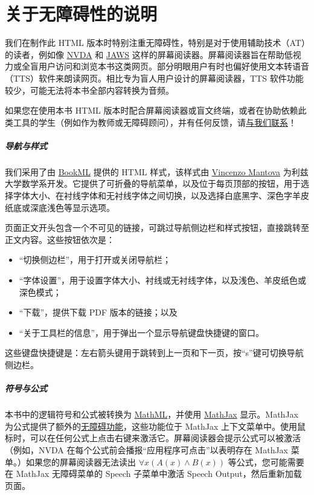 
\chapter{关于无障碍性的说明}

我们在制作此 HTML 版本时特别注重无障碍性，特别是对于使用辅助技术（AT）的读者，例如像 \href{https://www.nvaccess.org/download/}{NVDA} 和 \href{https://www.freedomscientific.com/products/software/jaws/}{JAWS} 这样的屏幕阅读器。屏幕阅读器旨在帮助低视力或全盲用户访问和浏览本书这类网页。部分明眼用户有时也偏好使用文本转语音（TTS）软件来朗读网页。相比专为盲人用户设计的屏幕阅读器，TTS 软件功能较少，可能无法将本书全部内容转换为音频。

如果您在使用本书 HTML 版本时配合屏幕阅读器或盲文终端，或者在协助依赖此类工具的学生（例如作为教师或无障碍顾问），并有任何反馈，请\href{mailto:rzach@ucalgary.ca}{与我们联系}！

\paragraph{导航与样式} 我们采用了由 \href{https://vlmantova.github.io/bookml/}{BookML} 提供的 HTML 样式，该样式由 \href{https://eps.leeds.ac.uk/maths/staff/4058/dr-vincenzo-l-mantova}{Vincenzo Mantova} 为利兹大学数学系开发。它提供了可折叠的导航菜单，以及位于每页顶部的按钮，用于选择字体大小、在衬线字体和无衬线字体之间切换，以及选择白底黑字、深色字羊皮纸底或深底浅色等显示选项。

页面正文开头包含一个不可见的链接，可跳过导航侧边栏和样式按钮，直接跳转至正文内容。这些按钮依次是：
\begin{itemize}
  \item“切换侧边栏”，用于打开或关闭导航栏；
  \item“字体设置”，用于设置字体大小、衬线或无衬线字体，以及浅色、羊皮纸色或深色模式；
  \item“下载”，提供下载 PDF 版本的链接；以及
  \item“关于工具栏的信息”，用于弹出一个显示导航键盘快捷键的窗口。
\end{itemize}
这些键盘快捷键是：左右箭头键用于跳转到上一页和下一页，按“s”键可切换导航侧边栏。

\paragraph{符号与公式}

本书中的逻辑符号和公式被转换为 \href{https://www.w3.org/Math/}{MathML}，并使用 \href{https://www.mathjax.org/}{MathJax} 显示。MathJax 为公式提供了额外的\href{https://docs.mathjax.org/en/latest/basic/accessibility.html}{无障碍功能}，这些功能位于 MathJax 上下文菜单中。使用鼠标时，可以在任何公式上点击右键来激活它。屏幕阅读器会提示公式可以被激活（例如，NVDA 在每个公式前会播报“应用程序可点击”以表明存在 MathJax 菜单。）如果您的屏幕阅读器无法读出 $\forall x(A(x) \land B(x))$ 等公式，您可能需要在 MathJax 无障碍菜单的 Speech 子菜单中激活 Speech Output，然后重新加载页面。

